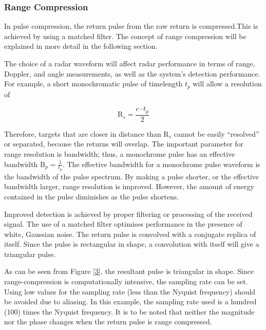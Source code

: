 \subsubsection{Range Compression}

In pulse compression, the return pulse from the raw return is
compressed.\smallskip  This is achieved by using a matched filter. The
concept of range compression will be explained in more detail in the
following section.

The choice of a radar waveform will affect radar performance in terms of
range, Doppler, and angle measurements, as well as the system's detection
performance. For example, a short monochromatic pulse of timelength $t_{p}$
will allow a resolution of

\begin{equation}
\text{R}_{s}=\frac{c\cdot t_{p}}{2}
\end{equation}
\smallskip 

Therefore, targets that are closer in distance than R$_{s}$ cannot be easily
``resolved'' or separated, because the returns will overlap. The important
parameter for range resolution is bandwidth; thus, a monochrome pulse has an
effective bandwidth B$_{p}=\frac{1}{t_{p}}$. The effective bandwidth for a
monochrome pulse waveform is the bandwidth of the pulse spectrum. By making
a pulse shorter, or the effective bandwidth larger, range resolution is
improved. However, the amount of energy contained in the pulse diminishes as
the pulse shortens.

Improved detection is achieved by proper filtering or processing of the
received signal. The use of a matched filter optimises performance in the
presence of white, Gaussian noise. The return pulse is convolved with a
conjugate replica of itself. Since the pulse is rectangular in shape, a
convolution with itself will give a triangular pulse.

As can be seen from Figure \ref{3}, the resultant pulse is triangular in
shape. Since range-compression is computationally intensive, the sampling
rate can be set. Using low values for the sampling rate (less than the
Nyquist frequency) should be avoided due to aliasing. In this example, the
sampling rate used is a hundred (100) times the Nyquist frequency. It is to
be noted that neither the magnitude nor the phase changes when the return
pulse is range compressed.\smallskip {}

